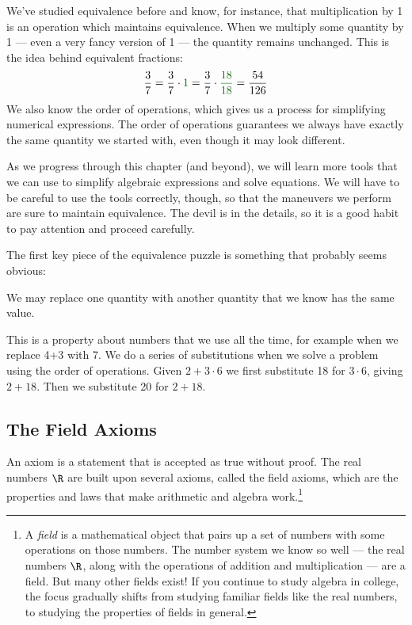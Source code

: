We've studied equivalence before and know, for instance, that multiplication by 1 is an operation which maintains equivalence. When we multiply some quantity by 1 --- even a very fancy version of 1 --- the quantity remains unchanged. This is the idea behind equivalent fractions: \[\frac{3}{7} = \frac{3}{7}\cdot{\color{green!40!black}1} = \frac{3}{7}\cdot{\color{green!40!black}\frac{18}{18}} = \frac{54}{126}\]
We also know the order of operations, which gives us a process for simplifying numerical expressions. The order of operations guarantees we always have exactly the same quantity we started with, even though it may look different.

As we progress through this chapter (and beyond), we will learn more tools that we can use to simplify algebraic expressions and solve equations. We will have to be careful to use the tools correctly, though, so that the maneuvers we perform are sure to maintain equivalence. The devil is in the details, so it is a good habit to pay attention and proceed carefully.

The first key piece of the equivalence puzzle is something that probably seems obvious:

\begin{boxeddef}[Substitution]
We may replace one quantity with another quantity that we know has the same value.
\end{boxeddef}

This is a property about numbers that we use all the time, for example when we replace 4+3 with 7. We do a series of substitutions when we solve a problem using the order of operations. Given $2+3\cdot6$ we first substitute 18 for $3\cdot6$, giving $2+18$. Then we substitute 20 for $2+18$.

\subsection{The Field Axioms}

An \gls{axiom} is a statement that is accepted as true without proof. The real numbers $\R$ are built upon several axioms, called the \glspl{field axiom}, which are the properties and laws that make arithmetic and algebra work.\footnote{A \textit{field} is a mathematical object that pairs up a set of numbers with some operations on those numbers. The number system we know so well --- the real numbers $\R$, along with the operations of addition and multiplication --- are a field. But many other fields exist! If you continue to study algebra in college, the focus gradually shifts from studying familiar fields like the real numbers, to studying the properties of fields in general.}

